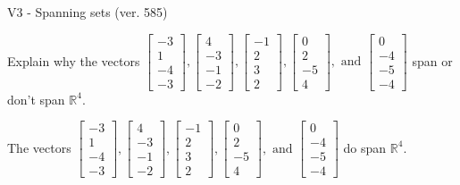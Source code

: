 \begin{exercise}
  \begin{exerciseTitle}V3 - Spanning sets (ver. 585)\end{exerciseTitle}
  \begin{exerciseStatement}
    Explain why the vectors \(\left[\begin{array}{r}
-3 \\
1 \\
-4 \\
-3
\end{array}\right] , \left[\begin{array}{r}
4 \\
-3 \\
-1 \\
-2
\end{array}\right] , \left[\begin{array}{r}
-1 \\
2 \\
3 \\
2
\end{array}\right] , \left[\begin{array}{r}
0 \\
2 \\
-5 \\
4
\end{array}\right] , \text{ and } \left[\begin{array}{r}
0 \\
-4 \\
-5 \\
-4
\end{array}\right]\) span or don't span \(\mathbb{R}^4\). 
	


  \end{exerciseStatement}
  \begin{exerciseAnswer}
   The vectors \(\left[\begin{array}{r}
-3 \\
1 \\
-4 \\
-3
\end{array}\right] , \left[\begin{array}{r}
4 \\
-3 \\
-1 \\
-2
\end{array}\right] , \left[\begin{array}{r}
-1 \\
2 \\
3 \\
2
\end{array}\right] , \left[\begin{array}{r}
0 \\
2 \\
-5 \\
4
\end{array}\right] , \text{ and } \left[\begin{array}{r}
0 \\
-4 \\
-5 \\
-4
\end{array}\right]\) 
  	 do  
	span \(\mathbb{R}^4\).
  



\end{exerciseAnswer}
\end{exercise}

